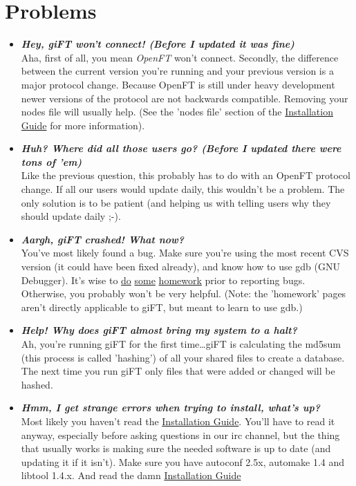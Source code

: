 \documentclass[10pt]{article}
\newcommand{\question}[1]{\item\textbf{\emph{#1}}}
\begin{document}
\section{Problems}
\begin{itemize}

\question {Hey, giFT won't connect! (Before I updated it was
fine)}\\
Aha, first of all, you mean \emph{OpenFT} won't connect.
Secondly, the difference between the current version you're
running and your previous version is a major protocol change.
Because OpenFT is still under heavy development newer versions of
the protocol are not backwards compatible.  Removing your nodes
file will usually help. (See the 'nodes file' section of the
\href{http://gift.sourceforge.net/docs/?document=install.html}{Installation
Guide} for more information).

\question {Huh? Where did all those users go? (Before I updated
there were tons of 'em)}\\
Like the previous question, this probably has to do with an OpenFT
protocol change.  If all our users would update daily, this
wouldn't be a problem.  The only solution is to be patient (and
helping us with telling users why they should update daily ;-).

\question {Aargh, giFT crashed! What now?}\\
You've most likely found a bug. Make sure you're using the most
recent CVS version (it could have been fixed already), and know
how to use gdb (GNU Debugger). It's wise to
\href{http://wand.cs.waikato.ac.nz/~dhtrl1/pl5/gdb.html}{do}
\href{http://web.mit.edu/sipb-iap/unixsoftdev/www/gdb.html}{some} 
\href{http://users.actcom.co.il/~choo/lupg/tutorials/debugging/debugging-with-gdb.html}{homework} 
prior to reporting bugs. Otherwise, you probably won't be very
helpful. (Note: the 'homework' pages aren't directly applicable to
giFT, but meant to learn to use gdb.)

\question {Help! Why does giFT almost bring my system to a
halt?}\\
Ah, you're running giFT for the first time\ldots  giFT is
calculating the md5sum (this process is called 'hashing') of all
your shared files to create a database. The next time you run giFT
only files that were added or changed will be hashed.

\question {Hmm, I get strange errors when trying to install,
what's up?}\\
Most likely you haven't read the
\href{http://gift.sourceforge.net/docs/?document=install.html}{Installation
Guide}. You'll have to read it anyway, especially before asking
questions in our irc channel, but the thing that usually works is
making sure the needed software is up to date (and updating it if
it isn't). Make sure you have autoconf 2.5x, automake 1.4 and
libtool 1.4.x. And read the damn
\href{http://gift.sourceforge.net/docs/?document=install.html}{Installation
Guide}

\end{itemize}
\end{document}
